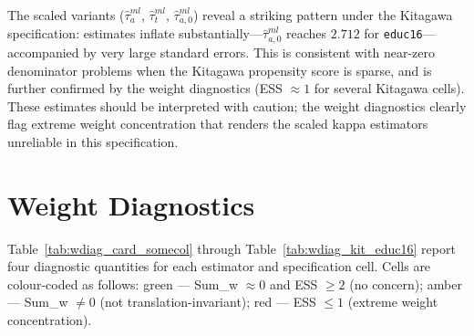 \documentclass[12pt]{article}
\begin{document}
The scaled variants ($\hat{\tau}^{ml}_{a}$,
$\hat{\tau}^{ml}_{t}$, $\hat{\tau}^{ml}_{a,0}$) reveal a
striking pattern under the Kitagawa specification: estimates
inflate substantially---$\hat{\tau}^{ml}_{a,0}$ reaches
$2.712$ for \texttt{educ16}---accompanied by very large
standard errors. This is consistent with near-zero
denominator problems when the Kitagawa propensity score is
sparse, and is further confirmed by the weight diagnostics
(ESS $\approx 1$ for several Kitagawa cells). These
estimates should be interpreted with caution; the weight
diagnostics clearly flag extreme weight concentration that
renders the scaled kappa estimators unreliable in this
specification.



\section*{Weight Diagnostics}

Table~\ref{tab:wdiag_card_somecol} through
Table~\ref{tab:wdiag_kit_educ16} report four diagnostic
quantities for each estimator and specification cell.
Cells are colour-coded as follows:
\colorbox{diagOK}{\color{diagOKText}green} — Sum\_w $\approx 0$
and ESS $\geq 2$ (no concern);
\colorbox{diagWarn}{\color{diagWarnText}amber} — Sum\_w $\neq 0$
(not translation-invariant);
\colorbox{diagFlag}{\color{diagFlagText}red} — ESS $\leq 1$
(extreme weight concentration).

\newcommand{\cellRed}[1]{%
  \cellcolor{diagFlag}\color{diagFlagText}#1}
\newcommand{\cellAmber}[1]{%
  \cellcolor{diagWarn}\color{diagWarnText}#1}
\newcommand{\cellGreen}[1]{%
  \cellcolor{diagOK}\color{diagOKText}#1}
\end{document}
